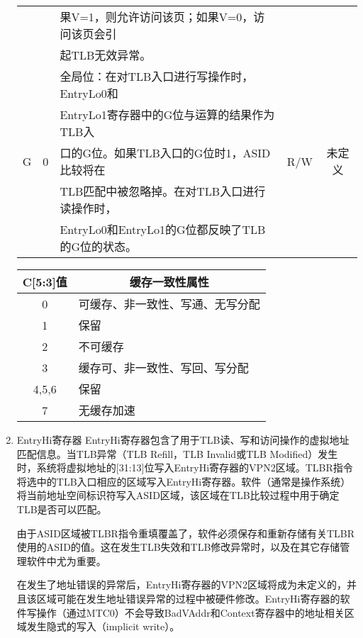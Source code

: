 \begin{enumerate}[(1)]
\begin{table}[H]
\begin{tabular}{|c|c|c|c|c|}
&&
\multicolumn{1}{l|}{果V=1，则允许访问该页；如果V=0，访问该页会引}&
&\\
&&
\multicolumn{1}{l|}{起TLB无效异常。}&
&\\
\hline
\multirow{5}{*}{G}&
\multirow{5}{*}{0}&
\multicolumn{1}{l|}{全局位：在对TLB入口进行写操作时，EntryLo0和}&
\multirow{5}{*}{R/W}&
\multirow{5}{*}{未定义}\\
&&
\multicolumn{1}{l|}{EntryLo1寄存器中的G位与运算的结果作为TLB入}&
&\\
&&
\multicolumn{1}{l|}{口的G位。如果TLB入口的G位时1，ASID比较将在}&
&\\
&&
\multicolumn{1}{l|}{TLB匹配中被忽略掉。在对TLB入口进行读操作时，}&
&\\
&&
\multicolumn{1}{l|}{EntryLo0和EntryLo1的G位都反映了TLB的G位的状态。}&
&\\
\hline
\end{tabular}
\end{table}

\begin{table}[H]
\centering
\begin{tabular}{|c|l|}
\hline
C[5:3]值&
\multicolumn{1}{c|}{缓存一致性属性}\\
\hline
0&可缓存、非一致性、写通、无写分配\\
\hline
1&保留\\
\hline
2&不可缓存\\
\hline
3&缓存可、非一致性、写回、写分配\\
\hline
4,5,6&保留\\
\hline
7&无缓存加速\\
\hline
\end{tabular}
\end{table}

\item EntryHi寄存器
EntryHi寄存器包含了用于TLB读、写和访问操作的虚拟地址匹配信息。当TLB异常（TLB Refill，TLB Invalid或TLB Modified）发生时，系统将虚拟地址的[31:13]位写入EntryHi寄存器的VPN2区域。TLBR指令将选中的TLB入口相应的区域写入EntryHi寄存器。软件（通常是操作系统）将当前地址空间标识符写入ASID区域，该区域在TLB比较过程中用于确定TLB是否可以匹配。

由于ASID区域被TLBR指令重填覆盖了，软件必须保存和重新存储有关TLBR使用的ASID的值。这在发生TLB失效和TLB修改异常时，以及在其它存储管理软件中尤为重要。

在发生了地址错误的异常后，EntryHi寄存器的VPN2区域将成为未定义的，并且该区域可能在发生地址错误异常的过程中被硬件修改。EntryHi寄存器的软件写操作（通过MTC0）不会导致BadVAddr和Context寄存器中的地址相关区域发生隐式的写入（implicit write）。


\end{enumerate}
